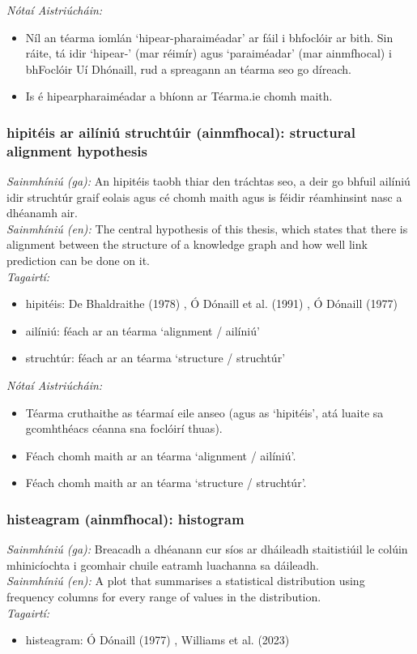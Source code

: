  \noindent \textit{Nótaí Aistriúcháin:}
\begin{itemize}
	\item Níl an téarma iomlán `hipear-pharaiméadar' ar fáil i bhfoclóir ar bith. Sin ráite, tá idir `hipear-' (mar réimír) agus `paraiméadar' (mar ainmfhocal) i bhFoclóir Uí Dhónaill, rud a spreagann an téarma seo go díreach.
	\item Is é hipearpharaiméadar a bhíonn ar Téarma.ie chomh maith.
\end{itemize}


\subsubsection*{hipitéis ar ailíniú struchtúir (ainmfhocal): structural alignment hypothesis}
 \noindent \textit{Sainmhíniú (ga):} An hipitéis taobh thiar den tráchtas seo, a deir go bhfuil ailíniú idir struchtúr graif eolais agus cé chomh maith agus is féidir réamhinsint nasc a dhéanamh air.
\\
 \noindent \textit{Sainmhíniú (en):} The central hypothesis of this thesis, which states that there is alignment between the structure of a knowledge graph and how well link prediction can be done on it.
\\
 \noindent \textit{Tagairtí:}
\begin{itemize}
	\item hipitéis: De Bhaldraithe (1978) \cite{de-bhaldraithe}, Ó Dónaill et al. (1991) \cite{focloir-beag}, Ó Dónaill (1977) \cite{odonaill}
	\item ailíniú: féach ar an téarma `alignment / ailíniú'
	\item struchtúr: féach ar an téarma `structure / struchtúr'
\end{itemize}

 \noindent \textit{Nótaí Aistriúcháin:}
\begin{itemize}
	\item Téarma cruthaithe as téarmaí eile anseo (agus as `hipitéis', atá luaite sa gcomhthéacs céanna sna foclóirí thuas).
	\item Féach chomh maith ar an téarma `alignment / ailíniú'.
	\item Féach chomh maith ar an téarma `structure / struchtúr'.
\end{itemize}


\subsubsection*{histeagram (ainmfhocal): histogram}
 \noindent \textit{Sainmhíniú (ga):} Breacadh a dhéanann cur síos ar dháileadh staitistiúil le colúin mhinicíochta i gcomhair chuile eatramh luachanna sa dáileadh.
\\
 \noindent \textit{Sainmhíniú (en):} A plot that summarises a statistical distribution using frequency columns for every range of values in the distribution.
\\
 \noindent \textit{Tagairtí:}
\begin{itemize}
	\item histeagram: Ó Dónaill (1977) \cite{odonaill}, Williams et al. (2023) \cite{storchiste}
\end{itemize}

